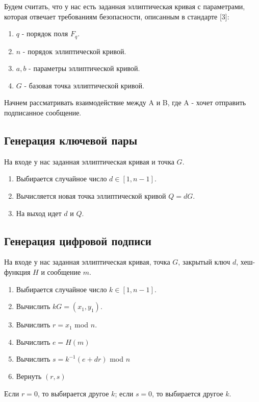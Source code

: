 \documentclass[colorthm]{./civarticle}
\begin{document}
Будем считать, что у нас есть заданная эллиптическая кривая с параметрами, которая отвечает требованиям безопасности, описанным в стандарте [3]:

\begin{enumerate}
    \item $q$ - порядок поля $F_q$.
    \item $n$ - порядок эллиптической кривой.
    \item $a, b$ - параметры эллиптической кривой.
    \item $G$ - базовая точка эллиптической кривой.
\end{enumerate}

Начнем рассматривать взаимодействие между A и B, где A - хочет отправить подписанное сообщение.

\subsection{Генерация ключевой пары}
На входе у нас заданная эллиптическая кривая и точка $G$.

\begin{enumerate}
    \item Выбирается случайное число $d \in [1, n-1]$.
    \item Вычисляется новая точка эллиптической кривой $Q=dG$.
    \item На выход идет $d$ и $Q$.
\end{enumerate}

\subsection{Генерация цифровой подписи}
На входе у нас заданная эллиптическая кривая, точка $G$, закрытый ключ $d$, хеш-функция $H$ и сообщение $m$.

\begin{enumerate}
    \item Выбирается случайное число $k \in [1, n-1]$.
    \item Вычислить $kG = (x_1, y_1)$.
    \item Вычислить $r = x_1$ mod $n$.
    \item Вычислить $e = H(m)$
    \item Вычислить $s = k^{-1}(e+dr)$ mod $n$
    \item Вернуть $(r, s)$
\end{enumerate}

Если $r=0$, то выбирается другое $k$; если $s=0$, то выбирается другое $k$.
\end{document}
